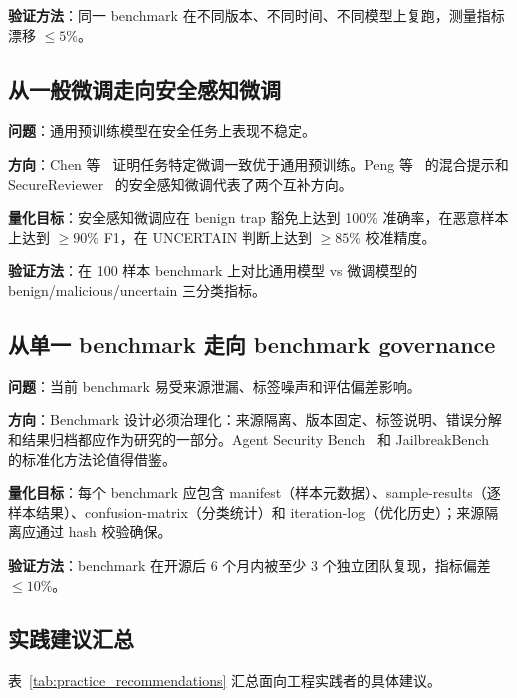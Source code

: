 \documentclass[11pt,a4paper,onecolumn]{article}
\begin{document}
\textbf{验证方法}：同一 benchmark 在不同版本、不同时间、不同模型上复跑，测量指标漂移 $\leq 5\%$。

\subsection{从一般微调走向安全感知微调}
\textbf{问题}：通用预训练模型在安全任务上表现不稳定。

\textbf{方向}：Chen 等~\cite{chen2026lmcode} 证明任务特定微调一致优于通用预训练。Peng 等~\cite{peng_2025_icodereviewer} 的混合提示和 SecureReviewer~\cite{secure_reviewer_2025} 的安全感知微调代表了两个互补方向。

\textbf{量化目标}：安全感知微调应在 benign trap 豁免上达到 100\% 准确率，在恶意样本上达到 $\geq 90\%$ F1，在 UNCERTAIN 判断上达到 $\geq 85\%$ 校准精度。

\textbf{验证方法}：在 100 样本 benchmark 上对比通用模型 vs 微调模型的 benign/malicious/uncertain 三分类指标。

\subsection{从单一 benchmark 走向 benchmark governance}
\textbf{问题}：当前 benchmark 易受来源泄漏、标签噪声和评估偏差影响。

\textbf{方向}：Benchmark 设计必须治理化：来源隔离、版本固定、标签说明、错误分解和结果归档都应作为研究的一部分。Agent Security Bench~\cite{zhang2024asb} 和 JailbreakBench~\cite{chao2024jailbreakbench} 的标准化方法论值得借鉴。

\textbf{量化目标}：每个 benchmark 应包含 manifest（样本元数据）、sample-results（逐样本结果）、confusion-matrix（分类统计）和 iteration-log（优化历史）；来源隔离应通过 hash 校验确保。

\textbf{验证方法}：benchmark 在开源后 6 个月内被至少 3 个独立团队复现，指标偏差 $\leq 10\%$。

\subsection{实践建议汇总}
表~\ref{tab:practice_recommendations} 汇总面向工程实践者的具体建议。
\end{document}
